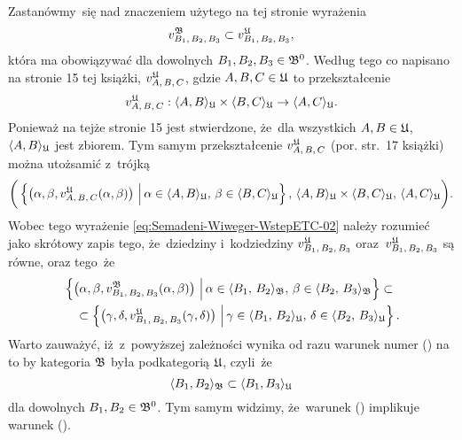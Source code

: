 \documentclass[a4paper,11pt]{article}
\begin{document}
\noindent
{} Zastanówmy~się nad znaczeniem użytego na tej stronie wyrażenia
\begin{equation}
  \label{eq:Semadeni-Wiweger-WstepETC-02}
  v_{ B_{ 1 }, \, B_{ 2 }, \, B_{ 3 } }^{ \mathfrak{B} } \subset
  v_{ B_{ 1 }, \, B_{ 2 }, \, B_{ 3 } }^{ \mathfrak{U} },
\end{equation}
która ma obowiązywać dla dowolnych $B_{ 1 }, B_{ 2 }, B_{ 3 } \in \mathfrak{B}^{ 0 }$.
Według tego co napisano na stronie 15 tej książki,
$v_{ A, \, B, \, C }^{ \mathfrak{U} }$, gdzie $A, B, C \in \mathfrak{U}$ to przekształcenie
\begin{equation}
  \label{eq:Semadeni-Wiweger-WstepETC-03}
  v_{ A, \, B, \, C }^{ \mathfrak{U} } :
  \langle A, B \rangle_{ \mathfrak{U} } \times \langle B, C \rangle_{ \mathfrak{U} } \to
  \langle A, C \rangle_{ \mathfrak{U} }.
\end{equation}
Ponieważ na tejże stronie 15 jest stwierdzone, że~dla wszystkich
$A, B \in \mathfrak{U}$, $\langle A, B \rangle_{ \mathfrak{U} }$ jest zbiorem. Tym samym przekształcenie
$v_{ A, \, B, \, C }^{ \mathfrak{U} }$ (por. str.~17 książki) można utożsamić z~trójką
\begin{equation}
  \label{eq:Semadeni-Wiweger-WstepETC-04}
  \bigg( \left\{ \left(\alpha, \beta, v_{ A, \, B, \, C }^{ \mathfrak{U} }( \alpha, \beta )
    \right) \, \Big| \,
    \alpha \in \langle A, B \rangle_{ \mathfrak{U} }, \, \beta \in \langle B, C \rangle_{ \mathfrak{U} } \right\}, \,
  \langle A, B \rangle_{ \mathfrak{U} } \times \langle B, C \rangle_{ \mathfrak{U} }, \,
  \langle A, C \rangle_{ \mathfrak{U} } \bigg).
\end{equation}
Wobec tego wyrażenie \eqref{eq:Semadeni-Wiweger-WstepETC-02} należy rozumieć
jako skrótowy zapis tego, że~dziedziny i~kodziedziny
$v_{ B_{ 1 }, \, B_{ 2 }, \, B_{ 3 } }^{ \mathfrak{U} }$
oraz~$v_{ B_{ 1 }, \, B_{ 2 }, \, B_{ 3 } }^{ \mathfrak{U} }$ są równe, oraz tego~że
\begin{equation}
  \label{eq:Semadeni-Wiweger-WstepETC-05}
  \begin{split}
    &\left\{ \left( \alpha, \beta,
      v_{ B_{ 1 }, \, B_{ 2 }, \, B_{ 3 } }^{ \mathfrak{B} }( \alpha, \beta )
      \right)
      \, \Big| \,
      \alpha \in \langle B_{ 1 }, \, B_{ 2 } \rangle_{ \mathfrak{B} }, \,
      \beta \in \langle B_{ 2 }, \, B_{ 3 } \rangle_{ \mathfrak{B} } \right\}
      \subset \\
    &\quad
      \subset
      \left\{ \left( \gamma, \delta,
      v_{ B_{ 1 }, \, B_{ 2 }, \, B_{ 3 } }^{ \mathfrak{U} }( \gamma, \delta )
      \right)
      \, \Big| \,
      \gamma \in \langle B_{ 1 }, \, B_{ 2 } \rangle_{ \mathfrak{U} }, \,
      \delta \in \langle B_{ 2 }, \, B_{ 3 } \rangle_{ \mathfrak{U} } \right\}.
  \end{split}
\end{equation}
Warto zauważyć, iż~z~powyższej zależności wynika od razu warunek numer
() na to by kategoria $\mathfrak{B}$ była podkategorią $\mathfrak{U}$,
czyli~że
\begin{equation}
  \label{eq:Semadeni-Wiweger-WstepETC-06}
  \langle B_{ 1 }, B_{ 2 } \rangle_{ \mathfrak{B} } \subset \langle B_{ 1 }, B_{ 3 } \rangle_{ \mathfrak{U} }
\end{equation}
dla dowolnych $B_{ 1 }, B_{ 2 } \in \mathfrak{B}^{ 0 }$. Tym samym widzimy,
że~warunek () implikuje warunek ().
\end{document}
